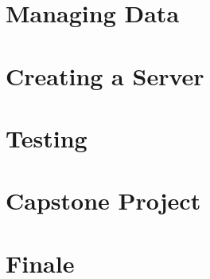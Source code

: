 \section*{Managing Data}


\section*{Creating a Server}


\section*{Testing}


\section*{Capstone Project}


\section*{Finale}

